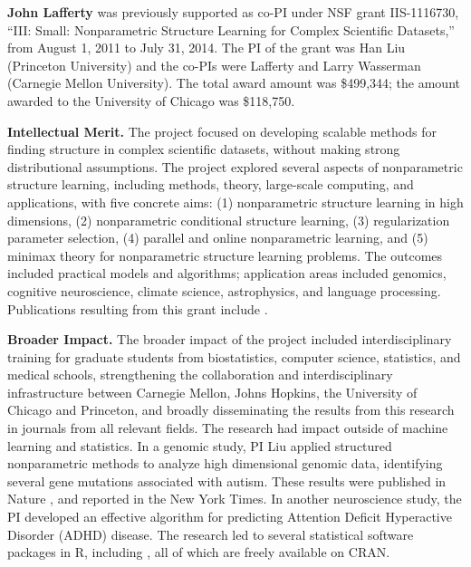

\textbf{John Lafferty} was previously supported as co-PI under NSF grant IIS-1116730,
``III: Small: Nonparametric Structure Learning for Complex Scientific
Datasets,'' from August 1, 2011 to July 31, 2014. The PI of the grant
was Han Liu (Princeton University) and the co-PIs were
Lafferty and Larry Wasserman (Carnegie Mellon University).  The
total award amount was \$499,344; the amount awarded to the University
of Chicago was \$118,750.

{\bf Intellectual Merit.}  
The project
focused on developing scalable methods for finding structure in
complex scientific datasets, without making strong distributional
assumptions. The project explored several aspects of nonparametric
structure learning, including methods, theory, large-scale computing,
and applications, with five concrete aims: (1) nonparametric structure
learning in high dimensions, (2) nonparametric conditional structure
learning, (3) regularization parameter selection, (4) parallel and
online nonparametric learning, and (5) minimax theory for
nonparametric structure learning problems.  The outcomes included
practical models and algorithms; application areas included genomics,
cognitive neuroscience, climate science, astrophysics, and language
processing.  Publications resulting from this grant
include 
\citep{fcca,mehddtgm,chen:13,challenges,quadro,bigp,admm,NRRR:NIPS,gu:12,ospif,hdssipca,tpca,pcangd,rspcr,tmehdv,scale,pca,bernoulli,direct,coda,spcahdmts,peace,cna,biglasso,fshdc,kolarhan,gemad,gemd,lafferty2012,flare,hdtgm,liu2012,skeptic,expoconc,insensitive,mrc,eigens,calibrate,blossom,Mishra:2015,patterns,mngm,fclime,joint,retm,tests,shender:13,soft,latenttree,tar,sconvex,xu:14,csc,sicec,calibratedp,huge,hdngevspnp,semirank,amrbcdm,qnegsm,Zhu:18}.


{\bf Broader Impact.}  
The broader impact of the project included interdisciplinary training
for graduate students from biostatistics, computer science, 
statistics, and medical schools, strengthening
the collaboration and interdisciplinary infrastructure between
Carnegie Mellon, Johns Hopkins, the University of Chicago and Princeton, and broadly
disseminating the results from this research in journals from all
relevant fields. The research had impact outside of machine learning and statistics.
In a genomic study, PI Liu applied structured nonparametric methods to analyze high
dimensional genomic data, identifying several gene mutations 
associated with autism.  These results were published
in Nature \citep{patterns}, and reported in the New York Times.
In another neuroscience study, the PI developed an effective
algorithm for predicting Attention Deficit Hyperactive Disorder
(ADHD) disease.  The research led to several 
statistical software packages in R, including
\citep{huge,fclime,flare}, all of which are freely available on CRAN.


